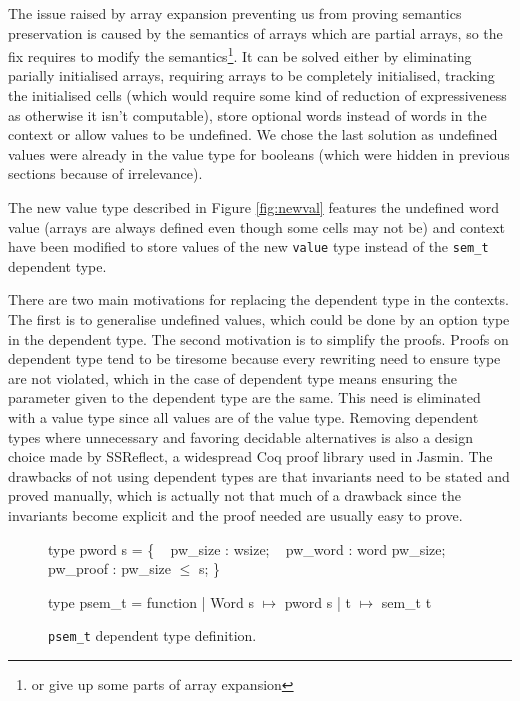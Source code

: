 \documentclass{article}
\begin{document}
\smallskip

The issue raised by array expansion preventing us from proving semantics
preservation is caused by the semantics of arrays which are partial arrays, so
the fix requires to modify the semantics\footnote{or give up some parts of array
expansion}. It can be solved either by eliminating parially initialised arrays,
requiring arrays to be completely initialised, tracking the initialised cells
(which would require some kind of reduction of expressiveness as otherwise it
isn’t computable), store optional words instead of words in the context or allow
values to be undefined. We chose the last solution as undefined values were
already in the value type for booleans (which were hidden in previous sections
because of irrelevance).

The new value type described in Figure \ref{fig:newval} features the undefined
word value (arrays are always defined even though some cells may not be) and
context have been modified to store values of the new \texttt{value} type
instead of the \texttt{sem\_t} dependent type.

\smallskip


There are two main motivations for replacing the dependent type in the contexts.
The first is to generalise undefined values, which could be done by an option
type in the dependent type. The second motivation is to simplify the proofs.
Proofs on dependent type tend to be tiresome because every rewriting need to
ensure type are not violated, which in the case of dependent type means ensuring
the parameter given to the dependent type are the same. This need is eliminated
with a value type since all values are of the value type. Removing dependent
types where unnecessary and favoring decidable alternatives is also a design
choice made by SSReflect, a widespread Coq proof library used in Jasmin. The
drawbacks of not using dependent types are that invariants need to be stated and
proved manually, which is actually not that much of a drawback since the
invariants become explicit and the proof needed are usually easy to prove.

\medskip

\begin{figure}
\obeylines\obeyspaces\ttfamily%
type pword s = \{
~ pw\_size  : wsize;
~ pw\_word  : word pw\_size;
~ pw\_proof : pw\_size \(\leq\) s;
\}

type psem\_t = function
| Word s \(\mapsto\) pword s
| t      \(\mapsto\) sem\_t t
\normalfont%
\caption{\texttt{psem\_t} dependent type definition.}\label{fig:psemt}
\end{figure}
\end{document}
